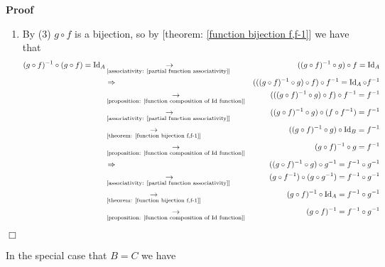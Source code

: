 \documentclass{book}
\newcommand{\Rightarrowlim}{\mathop{\rightarrow}\limits}
\newcommand{\tmop}[1]{\ensuremath{\operatorname{#1}}}
\newenvironment{proof}{\noindent\textbf{Proof\ }}{\hspace*{\fill}$\Box$\medskip}
\begin{document}
\begin{proof}
\begin{enumerate}
    \item By (3) $g \circ f$ is a bijection, so by [theorem: \ref{function
    bijection f,f-1}] we have that
    \begin{eqnarray*}
      (g \circ f)^{- 1} \circ (g \circ f) = \tmop{Id}_A &
      \Rightarrowlim_{\text{[associativity: \ref{partial function
      associativity}] }} & ((g \circ f)^{- 1} \circ g) \circ f = \tmop{Id}_A\\
      & \Rightarrow & (((g \circ f)^{- 1} \circ g) \circ f) \circ f^{- 1} =
      \tmop{Id}_A \circ f^{- 1}\\
      & \Rightarrowlim_{\text{[proposition: \ref{function composition of Id
      function}]}} & (((g \circ f)^{- 1} \circ g) \circ f) \circ f^{- 1} =
      f^{- 1}\\
      & \Rightarrowlim_{\text{[associativity: \ref{partial function
      associativity}] }} & ((g \circ f)^{- 1} \circ g) \circ (f \circ f^{- 1})
      = f^{- 1}\\
      & \Rightarrowlim_{\text{[theorem: \ref{function bijection f,f-1}]}} &
      ((g \circ f)^{- 1} \circ g) \circ \tmop{Id}_B = f^{- 1}\\
      & \Rightarrowlim_{\text{[proposition: \ref{function composition of Id
      function}]}} & (g \circ f)^{- 1} \circ g = f^{- 1}\\
      & \Rightarrow & ((g \circ f)^{- 1} \circ g) \circ g^{- 1} = f^{- 1}
      \circ g^{- 1}\\
      & \Rightarrowlim_{\text{[associativity: \ref{partial function
      associativity}] }} & (g \circ f^{- 1}) \circ (g \circ g^{- 1}) = f^{- 1}
      \circ g^{- 1}\\
      & \Rightarrowlim_{\text{[theorem: \ref{function bijection f,f-1}]}} &
      (g \circ f)^{- 1} \circ \tmop{Id}_A = f^{- 1} \circ g^{- 1}\\
      & \Rightarrowlim_{\text{[proposition: \ref{function composition of Id
      function}]}} & (g \circ f)^{- 1} = f^{- 1} \circ g^{- 1}
    \end{eqnarray*}
  \end{enumerate}
\end{proof}

In the special case that $B = C$ we have
\end{document}
